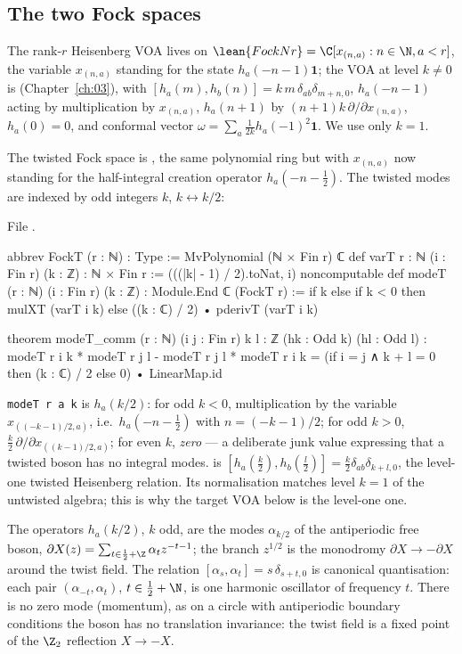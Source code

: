 \subsection{The two Fock spaces}\label{ch07:sec:fock}

The rank-$r$ Heisenberg VOA lives on $\lean{FockN r} = \C[x_{(n,a)} : n\in\N, a<r]$, the
variable $x_{(n,a)}$ standing for the state $h_a(-n-1)\mathbf 1$; the VOA at level $k\ne0$ is
 (Chapter~\ref{ch:03}), with
$[h_a(m),h_b(n)] = k\,m\,\delta_{ab}\delta_{m+n,0}$, $h_a(-n-1)$ acting by multiplication by
$x_{(n,a)}$, $h_a(n+1)$ by $(n+1)k\,\partial/\partial x_{(n,a)}$, $h_a(0)=0$, and conformal vector
$\omega = \sum_a \frac1{2k}h_a(-1)^2\mathbf 1$. We use only $k=1$.

The twisted Fock space is , the same polynomial ring but with $x_{(n,a)}$ now
standing for the half-integral creation operator $h_a(-n-\frac12)$. The twisted modes are indexed
by odd integers $k$, $k\leftrightarrow k/2$:

\noindent File .
\begin{leancode}
abbrev FockT (r : ℕ) : Type := MvPolynomial (ℕ × Fin r) ℂ
def varT {r : ℕ} (i : Fin r) (k : ℤ) : ℕ × Fin r := (((|k| - 1) / 2).toNat, i)
noncomputable def modeT (r : ℕ) (i : Fin r) (k : ℤ) : Module.End ℂ (FockT r) :=
  if k %
  else if k < 0 then mulXT (varT i k)
  else ((k : ℂ) / 2) • pderivT (varT i k)

theorem modeT_comm (r : ℕ) (i j : Fin r) {k l : ℤ} (hk : Odd k) (hl : Odd l) :
    modeT r i k * modeT r j l - modeT r j l * modeT r i k
      = (if i = j ∧ k + l = 0 then (k : ℂ) / 2 else 0) • LinearMap.id
\end{leancode}

\begin{dictionary}
\verb|modeT r a k| is $h_a(k/2)$: for odd $k<0$, multiplication by the variable
$x_{((-k-1)/2,a)}$, i.e.\ $h_a(-n-\frac12)$ with $n=(-k-1)/2$; for odd $k>0$, $\frac k2\,\partial/
\partial x_{((k-1)/2,a)}$; for even $k$, \emph{zero} --- a deliberate junk value expressing that a
twisted boson has no integral modes.  is
$[h_a(\tfrac k2),h_b(\tfrac l2)] = \tfrac k2\delta_{ab}\delta_{k+l,0}$, the level-one twisted
Heisenberg relation. Its normalisation matches level $k=1$ of the untwisted algebra; this is why
the target VOA below is the level-one one.
\end{dictionary}

\begin{physics}
The operators $h_a(k/2)$, $k$ odd, are the modes $\alpha_{k/2}$ of the antiperiodic free boson, $\partial X(z)=\sum_{t\in\frac12+\Z}\alpha_tz^{-t-1}$; the branch $z^{1/2}$ is the monodromy $\partial X\to-\partial X$ around the twist field. The relation $[\alpha_s,\alpha_t]=s\,\delta_{s+t,0}$ is canonical quantisation: each pair $(\alpha_{-t},\alpha_t)$, $t\in\tfrac12+\N$, is one harmonic oscillator of frequency $t$. There is no zero mode (momentum), as on a circle with antiperiodic boundary conditions the boson has no translation invariance: the twist field is a fixed point of the $\Z_2$ reflection $X\to-X$.
\end{physics}

